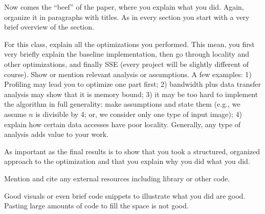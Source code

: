 Now comes the ``beef'' of the paper, where you explain what you
did. Again, organize it in paragraphs with titles. As in every section
you start with a very brief overview of the section.

For this class, explain all the optimizations you performed. This mean, you first very briefly
explain the baseline implementation, then go through locality and other optimizations, and finally SSE (every project will be slightly different of course). Show or mention relevant analysis or assumptions. A few examples: 1) Profiling may lead you to optimize one part first; 2) bandwidth plus data transfer analysis may show that it is memory bound; 3) it may be too hard to implement the algorithm in full generality: make assumptions and state them (e.g., we assume $n$ is divisible by 4; or, we consider only one type of input image); 4) explain how certain data accesses have poor locality. Generally, any type of analysis adds value to your work.

As important as the final results is to show that you took a structured, organized approach to the optimization and that you explain why you did what you did.

Mention and cite any external resources including library or other code.

Good visuals or even brief code snippets to illustrate what you did are good. Pasting large amounts of code to fill the space is not good.